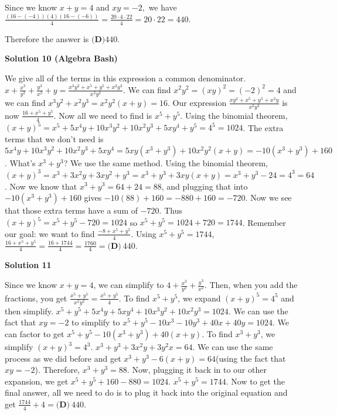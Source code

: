 \begin{enumerate}
 Since we know $x+y=4$ and $xy=-2,$ we have $\frac{(16-(-4))(4)(16-(-6))}{4} = \frac{20 \cdot 4 \cdot 22}{4} = 20 \cdot 22 = 440.$

 Therefore the answer is $\boxed{\textbf{(D)} 440}.$




\textbf{Solution 10 (Algebra Bash)}

We give all of the terms in this expression a common denominator. $x + \frac{x^3}{y^2} + \frac{y^3}{x^2} + y = \frac{x^3y^2 + x^5 + y^5 + x^2y^3}{x^2y^2}$. We can find $x^2y^2 = (xy)^2 = (-2)^2 = 4$ and we can find $x^3y^2 + x^2y^3 = x^2y^2(x + y) = 16$. Our expression $\frac{xy^2 + x^5 + y^5 + x^2y}{x^2y^2}$ is now $\frac{16 + x^5 + y^5}{4}$. Now all we need to find is $x^5 + y^5$. Using the binomial theorem, $(x + y)^5 = x^5 + 5x^4y + 10x^3y^2 + 10x^2y^3 + 5xy^4 + y^5 = 4^5 = 1024$. The extra terms that we don't need is $5x^4y + 10x^3y^2 + 10x^2y^3 + 5xy^4 = 5xy(x^3 + y^3) + 10x^2y^2(x + y) = -10(x^3 + y^3) + 160$. What's $x^3 + y^3$? We use the same method. Using the binomial theorem, $(x + y)^3 = x^3 + 3x^2y + 3xy^2 + y^3 = x^3 + y^3 + 3xy(x + y) = x^3 + y^3 - 24 = 4^3 = 64$. Now we know that $x^3 + y^3 = 64 + 24 = 88$, and plugging that into $-10(x^3 + y^3) + 160$ gives $-10(88) + 160 = -880 + 160 = -720$. Now we see that those extra terms have a sum of $-720$. Thus $(x + y)^5 = x^5 + y^5 - 720 = 1024$ so $x^5 + y^5 = 1024 + 720 = 1744$. Remember our goal: we want to find $\frac{-8 + x^5 + y^5}{4}$. Using $x^5 + y^5 = 1744$, $\frac{16 + x^5 + y^5}{4} = \frac{16 + 1744}{4} = \frac{1760}{4} = \boxed{\textbf{(D)}\ 440}$.

 



\textbf{Solution 11}

Since we know $x+y=4$, we can simplify to $4 + \frac{x^3}{y^2} + \frac{y^3}{x^2}$. Then, when you add the fractions, you get $\frac{x^5 + y^5}{x^2y^2} = \frac{x^5 + y^5}{4}$. To find $x^5 + y^5$, we expand $(x+y)^5 = 4^5$ and then simplify. $x^5+y^5+5x^4y+5xy^4+10x^3y^2+10x^2y^3 = 1024$. We can use the fact that $xy = -2$ to simplify to $x^5 + y^5-10x^3 - 10y^3 + 40x + 40y = 1024$. We can factor to get $x^5 + y^5 -10(x^3 + y^3) +40(x+y)$. To find $x^3 + y^3$, we simplify $(x+y)^3 = 4^3$. $x^3+y^3+3x^2y+3y^2x = 64$. We can use the same process as we did before and get $x^3 + y^3 -6(x+y) = 64$(using the fact that $xy = -2$). Therefore, $x^3 + y^3 = 88$. Now, plugging it back in to our other expansion, we get $x^5 + y^5 + 160 - 880 = 1024$. $x^5 +y^5 = 1744$. Now to get the final answer, all we need to do is to plug it back into the original equation and get $\frac{1744}{4} + 4 = \boxed{\textbf{(D)}\ 440}$. 


\end{enumerate}
